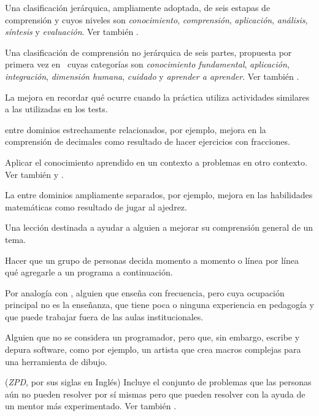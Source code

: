 \begin{description}
 Una clasificación jerárquica, ampliamente adoptada,
de seis estapas de comprensión y cuyos niveles son \emph{conocimiento},
\emph{comprensión}, \emph{aplicación}, \emph{análisis}, \emph{síntesis} y
\emph{evaluación}.
Ver también .

 Una clasificación de comprensión no jerárquica de seis partes, propuesta por primera vez en~\cite{Fink2013} cuyas categorías son \emph{conocimiento fundamental}, \emph{aplicación}, \emph{integración}, \emph{dimensión humana}, \emph{cuidado} y
\emph{aprender a aprender}. Ver también .

 La mejora en  recordar qué ocurre cuando la práctica utiliza actividades similares a las utilizadas en los tests.

  entre dominios estrechamente relacionados, por ejemplo, mejora en la comprensión de decimales como resultado de hacer ejercicios con fracciones.

 Aplicar el conocimiento aprendido en un contexto a problemas en otro contexto.  Ver también
 y .

 La  entre dominios ampliamente separados, por ejemplo, mejora en las habilidades matemáticas como resultado de jugar al ajedrez.

 Una lección destinada a ayudar a alguien a
mejorar su comprensión general de un tema.


Hacer que un grupo de personas decida momento a momento
o línea por línea qué agregarle a un programa a continuación.

 Por analogía con
,
alguien que enseña con frecuencia, pero cuya ocupación principal no es la enseñanza,
que tiene poca o ninguna experiencia en pedagogía y que puede trabajar fuera de las aulas institucionales.

 Alguien que no se considera
un programador, pero que, sin embargo, escribe y depura software, como por ejemplo, un artista que crea macros complejas para una herramienta de dibujo.

(\emph{ZPD}, por sus siglas en Inglés) Incluye el conjunto de problemas que las personas aún no pueden resolver por sí mismas pero que pueden resolver con la ayuda de un mentor más experimentado.  Ver también .

\end{description}
